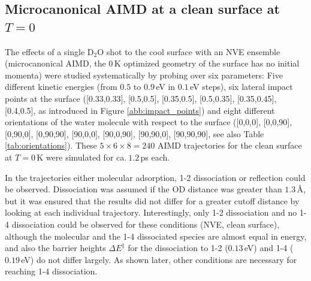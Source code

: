 \documentclass[11pt,DIV=13,BCOR=5mm,a4paper,headinclude]{scrbook}
\begin{document}
\subsection{Microcanonical AIMD at a clean surface at $T=0$}\label{sec:mic_clean}
The effects of a single D$_2$O shot to the cool surface with an NVE ensemble (microcanonical AIMD, the $0\,$K optimized geometry of the surface has no initial momenta) were studied systematically by probing over six parameters: Five different kinetic energies (from $0.5$ to $0.9\,$eV in $0.1\,$eV steps), six lateral impact points at the surface ([0.33,0.33], [0.5,0.5], [0.35,0.5], [0.5,0.35], [0.35,0.45], [0.4,0.5], as introduced in Figure \ref{abb:impact_points}) and eight different orientations of the water molecule with respect to the surface ([0,0,0], [0,0,90], [0,90,0], [0,90,90], [90,0,0], [90,0,90], [90,90,0], [90,90,90], see also Table \ref{tab:orientations}).
These $5\times 6\times 8=240$ AIMD trajectories for the clean surface at $T=0\,$K were simulated for ca.$~1.2\,$ps each.


In the trajectories  either molecular adsorption, 1-2 dissociation or reflection could be observed.
Dissociation was assumed if the OD distance was greater than $1.3\,$\AA{}, but it was ensured that the results did not differ for a greater cutoff distance by looking at each individual trajectory.
Interestingly, only 1-2 dissociation and no 1-4 dissociation could be observed for these conditions (NVE, clean surface), although the molecular and the 1-4 dissociated species are almost equal in energy, and also the barrier heights $\Delta E^\ddagger$ for the dissociation to 1-2 ($0.13\,$eV) and 1-4 ($0.19\,$eV) do not differ largely\cite{WirthJPCC2012}. %
As shown later, other conditions are necessary for reaching 1-4 dissociation.
\\
\end{document}
